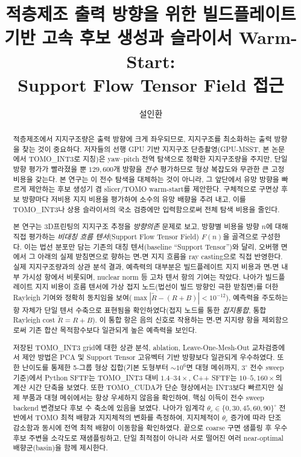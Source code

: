 \documentclass[11pt,a4paper]{article}
\title{적층제조 출력 방향을 위한 빌드플레이트 기반 고속 후보 생성과 슬라이서 Warm-Start:\\Support Flow Tensor Field 접근}
\author{설인환}
\date{}
\begin{document}
\maketitle

\begin{abstract}
적층제조에서 지지구조량은 출력 방향에 크게 좌우되므로, 지지구조를 최소화하는 출력 방향을 찾는 것이 중요하다.
저자들의 선행 GPU 기반 지지구조 단층촬영(GPU-MSST, 본 논문에서 TOMO\_INT3로 지칭)은
yaw--pitch 전역 탐색으로 정확한 지지구조량을 주지만, 단일 방향 평가가 빨라졌을 뿐
$129{,}600$개 방향을 \emph{전수} 평가하므로 형상 복잡도와 무관한 큰 고정비용을 갖는다.
본 연구는 이 전수 탐색을 대체하는 것이 아니라, 그 앞단에서 유망 방향을 빠르게 제안하는
후보 생성기 겸 slicer/TOMO warm-start를 제안한다.
구체적으로 구면상 후보 방향마다 저비용 지지 비용을 평가하여 소수의 유망 배향을 추려 내고,
이를 TOMO\_INT3나 상용 슬라이서의 국소 검증에만 입력함으로써 전체 탐색 비용을 줄인다.

본 연구는 3D프린팅의 지지구조 추정을 \emph{방향의존} 문제로 보고, 방향별 비용을 방향 $n$에 대해 직접 평가하는
\emph{비대칭 흐름 텐서}(Support Flow Tensor Field) $F(n)$을 골격으로 구성한다.
이는 법선 분포만 담는 기존의 대칭 텐서(baseline ``Support Tensor'')와 달리,
오버행 면에서 그 아래의 실제 받침면으로 향하는 면-면 지지 흐름을 ray casting으로 직접 반영한다.
실제 지지구조량과의 상관 분석 결과, 예측력의 대부분은 빌드플레이트 지지 비용과 면-면 내부 가시성 항에서 비롯되며,
nuclear norm 등 고차 텐서 항의 기여는 작았다.
나아가 빌드플레이트 지지 비용이 흐름 텐서에 가상 접지 노드(법선이 빌드 방향인 극한 받침면)를 더한
Rayleigh 기여와 정확히 동치임을 보여($\max|\tilde R-(R+B)|<10^{-12}$),
예측력을 주도하는 항 자체가 단일 텐서 수축으로 표현됨을 확인하였다(접지 노드를 통한 \emph{접지통합}, 통합 Rayleigh cost $\tilde R=R+B$).
이 통합 항은 음의 신호로 작용하는 면-면 지지량 항을 제외함으로써 기존 합산 목적함수보다 일관되게 높은 예측력을 보인다.

저장된 TOMO\_INT3 grid에 대한 상관 분석, ablation, Leave-One-Mesh-Out 교차검증에서
제안 방법은 PCA 및 Support Tensor 고유벡터 기반 방향보다 일관되게 우수하였다.
또한 난이도를 통제한 5-그룹 형상 집합(기본 도형부터 $\sim$$10^6$면 대형 메쉬까지, $3^\circ$ 전수 sweep 기준)에서
Python SFTF는 TOMO\_INT3 대비 $1.4$--$34\times$,
C++ SFTF는 $10$--$5{,}160\times$의 계산 시간 단축을 보였다.
또한 TOMO\_CUDA가 단순 형상에서는 INT3보다 빠르지만 실제 부품과 대형 메쉬에서는
항상 우세하지 않음을 확인하여, 핵심 이득이 전수 sweep backend 변경보다 후보 수 축소에 있음을 보였다.
나아가 임계각 $\theta_c\in\{0,30,45,60,90\}^\circ$ 전반에서 TOMO 최적 배향과 지지체적의 변화를 측정하여,
지지체적이 $\theta_c$ 증가에 따라 단조 감소함과 동시에 전역 최적 배향이 이동함을 확인하였다.
끝으로 coarse 구면 샘플링 후 우수 후보 주변을 소각도로 재샘플링하고,
단일 최적점이 아니라 서로 떨어진 여러 near-optimal 배향군(basin)을 함께 제시한다.
\end{abstract}
\end{document}
